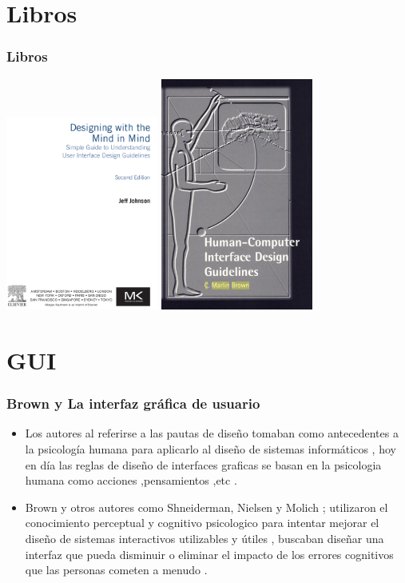 \documentclass[11pt]{beamer}
\begin{document}
\section{Libros}
\begin{frame}
\frametitle{Libros}

{\includegraphics[width=5.0cm]{img/Johnson.png}}
{\includegraphics[width=5.0cm]{img/brown.png}}

\end{frame}


\section{GUI}
\begin{frame}
\frametitle{ Brown y La interfaz gráfica de usuario}
\begin{itemize}
\item Los autores al referirse a las pautas de diseño tomaban como antecedentes a la psicología humana para aplicarlo al diseño de sistemas informáticos , hoy en día las reglas de diseño de interfaces graficas se basan en la psicologia humana como acciones ,pensamientos ,etc .
\item Brown y otros autores como Shneiderman, Nielsen y Molich ;  utilizaron el conocimiento perceptual y cognitivo psicologico para intentar mejorar el diseño de sistemas interactivos utilizables y útiles , buscaban diseñar una interfaz  que  pueda disminuir o eliminar el impacto de los errores cognitivos que las personas cometen a menudo .

\end{itemize}
\end{frame}
\end{document}
